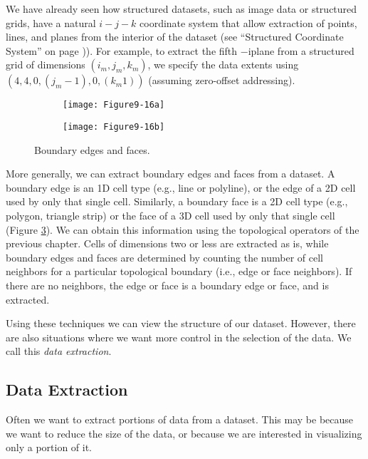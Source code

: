 We have already seen how structured datasets, such as image data or structured grids, have a natural $i-j-k$ coordinate system that allow extraction of points, lines, and planes from the interior of the dataset (see ``Structured Coordinate System'' on page \pageref{subsec:structured_coordinate_system})). For example, to extract the fifth $-$iplane from a structured grid of dimensions $(i_m, j_m, k_m)$, we specify the data extents using $(4, 4, 0, (j_m - 1), 0, (k_m 1))$ (assuming zero-offset addressing).

\begin{figure}[htb]
	\begin{subfigure}[h]{0.48\linewidth}
		\texttt{[image: Figure9-16a]}
		\captionsetup{justification=centering}
		\caption*{}
		\label{fig:Figure9-16a}
	\end{subfigure}
	\hfill
	\begin{subfigure}[h]{0.48\linewidth}
		\texttt{[image: Figure9-16b]}
		\captionsetup{justification=centering}
		\caption*{}
		\label{fig:Figure9-16b}
	\end{subfigure}
	\caption{Boundary edges and faces.}\label{fig:Figure9-16}
\end{figure}

More generally, we can extract boundary edges and faces from a dataset. A boundary edge is an 1D cell type (e.g., line or polyline), or the edge of a 2D cell used by only that single cell. Similarly, a boundary face is a 2D cell type (e.g., polygon, triangle strip) or the face of a 3D cell used by only that single cell (Figure \ref{fig:Figure9-16}). We can obtain this information using the topological operators of the previous chapter. Cells of dimensions two or less are extracted as is, while boundary edges and faces are determined by counting the number of cell neighbors for a particular topological boundary (i.e., edge or face neighbors). If there are no neighbors, the edge or face is a boundary edge or face, and is extracted.

Using these techniques we can view the structure of our dataset. However, there are also situations where we want more control in the selection of the data. We call this \emph{data extraction}.

\subsection{Data Extraction}

Often we want to extract portions of data from a dataset. This may be because we want to reduce the size of the data, or because we are interested in visualizing only a portion of it.

